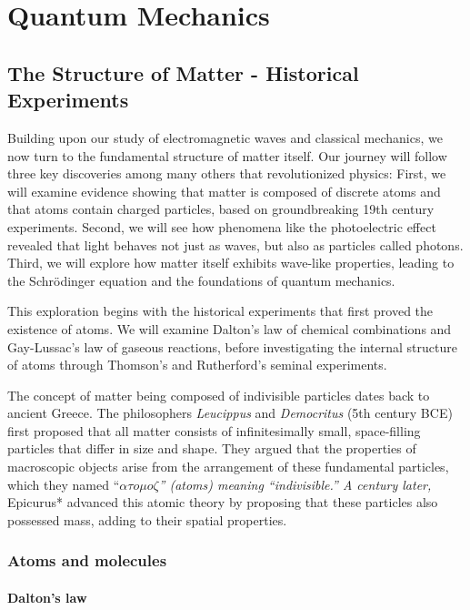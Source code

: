 \documentclass[
  a4paper,
]{book}
\begin{document}
\part{Quantum Mechanics}

\chapter{The Structure of Matter - Historical
Experiments}\label{the-structure-of-matter---historical-experiments}

Building upon our study of electromagnetic waves and classical
mechanics, we now turn to the fundamental structure of matter itself.
Our journey will follow three key discoveries among many others that
revolutionized physics: First, we will examine evidence showing that
matter is composed of discrete atoms and that atoms contain charged
particles, based on groundbreaking 19th century experiments. Second, we
will see how phenomena like the photoelectric effect revealed that light
behaves not just as waves, but also as particles called photons. Third,
we will explore how matter itself exhibits wave-like properties, leading
to the Schrödinger equation and the foundations of quantum mechanics.

This exploration begins with the historical experiments that first
proved the existence of atoms. We will examine Dalton's law of chemical
combinations and Gay-Lussac's law of gaseous reactions, before
investigating the internal structure of atoms through Thomson's and
Rutherford's seminal experiments.

The concept of matter being composed of indivisible particles dates back
to ancient Greece. The philosophers \emph{Leucippus} and
\emph{Democritus} (5th century BCE) first proposed that all matter
consists of infinitesimally small, space-filling particles that differ
in size and shape. They argued that the properties of macroscopic
objects arise from the arrangement of these fundamental particles, which
they named ``\emph{\(\alpha \tau o \mu o \zeta\)'' (atoms) meaning
``indivisible.'' A century later, }Epicurus* advanced this atomic theory
by proposing that these particles also possessed mass, adding to their
spatial properties.

\section{Atoms and molecules}\label{atoms-and-molecules}

\subsection{Dalton's law}\label{daltons-law}
\end{document}

